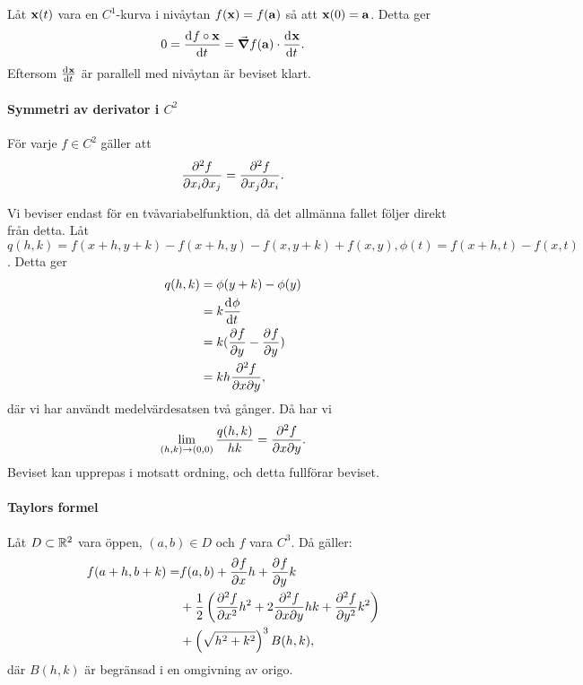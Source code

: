 \proof
Låt $\vect{x}(t)$ vara en $C^1$-kurva i nivåytan $f(\vect{x}) = f(\vect{a})$ så att $\vect{x}(0) = \vect{a}$. Detta ger
\begin{align*}
	0 = \deval{f\circ \vect{x}}{t}{0} = \grad{f}(\vect{a})\cdot\deval{\vect{x}}{t}{0}.
\end{align*}
Eftersom $\deval{\vect{x}}{t}{0}$ är parallell med nivåytan är beviset klart.

\paragraph{Symmetri av derivator i $C^2$}
För varje $f\in C^2$ gäller att
\begin{align*}
	\pdv{f}{x_i}{x_j} = \pdv{f}{x_j}{x_i}.
\end{align*}

\proof
Vi beviser endast för en tvåvariabelfunktion, då det allmänna fallet följer direkt från detta. Låt $q(h, k) = f(x + h, y + k) - f(x + h, y) - f(x, y + k) + f(x, y), \phi(t) = f(x + h, t) - f(x, t)$. Detta ger
\begin{align*}
	q(h, k) &= \phi(y + k) - \phi(y) \\
	        &= k\dv[]{\phi}{t} (y + \theta k) \\
	        &= k(\pdv[]{f}{y} (x + h, y + \theta k) - \pdv[]{f}{y} (x, y + \theta k)) \\
	        &= kh\pdv{f}{x}{y} (x + \eta h, y + \theta k),
\end{align*}
där vi har användt medelvärdesatsen två gånger. Då har vi
\begin{align*}
	\lim\limits_{(h, k)\to (0, 0)}\frac{q(h, k)}{hk} = \pdv{f}{x}{y} (x, y).
\end{align*}
Beviset kan upprepas i motsatt ordning, och detta fullförar beviset.

\paragraph{Taylors formel}
Låt $D\subset\mathbb{R}^2$ vara öppen, $(a, b)\in D$ och $f$ vara $C^3$. Då gäller:
\begin{align*}
	f(a + h, b + k) =& f(a, b) + \pdv[]{f}{x} (a, b)h + \pdv[]{f}{y} (a, b)k \\
	                 &+ \frac{1}{2}\left(\pdv[2]{f}{x} (a, b)h^2 + 2\pdv{f}{x}{y} (a, b)hk + \pdv[2]{f}{y} (a, b)k^2\right) \\
	                 &+ \left(\sqrt{h^2 + k^2}\right)^3B(h, k),
\end{align*}
där $B(h, k)$ är begränsad i en omgivning av origo.

